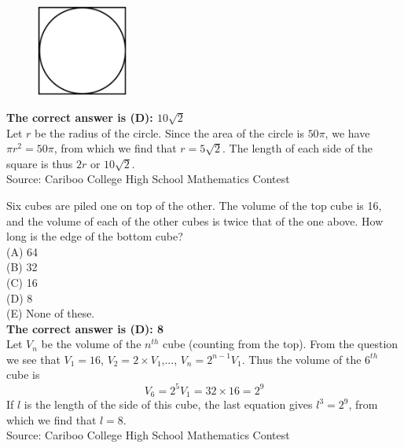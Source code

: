 \documentclass{article}
\begin{document}
\begin{figure}
	\includegraphics[width=30mm,viewport=47 157 506 618]{CCSPR74-2pic.eps}
\end{figure}

\textbf{The correct answer is (D): $10\sqrt{2}$}\\
Let $r$ be the radius of the circle. Since the area of the circle is $50\pi$, we have $\pi r^{2}=50\pi$, from which we find that $r=5\sqrt{2}$. The length of each side of the square is thus $2r$ or $10\sqrt{2}$.
\\[5 ex]

\scriptsize
Source: Cariboo College High School Mathematics Contest

\normalsize
Six cubes are piled one on top of the other. The volume of the top cube is 16, and the volume of each of the other cubes is twice that of the one above. How long is the edge of the bottom cube?\\
(A) 64\\
(B) 32\\
(C) 16\\
(D) 8\\
(E) None of these.\\


\textbf{The correct answer is (D): 8}\\
Let $V_n$ be the volume of the $n^{th}$ cube (counting from the top). From the question we see that $V_{1}=16$, $V_{2}=2\times V_{1}$,..., $V_{n}=2^{n-1}V_{1}$. Thus the volume of the $6^{th}$ cube is
\begin{equation*}
V_{6}=2^{5}V_{1}=32\times16=2^9
\end{equation*}
If $l$ is the length of the side of this cube, the last equation gives $l^{3}=2^9$, from which we find that $l=8$.
\\[5 ex]
\scriptsize
Source: Cariboo College High School Mathematics Contest
\end{document}
